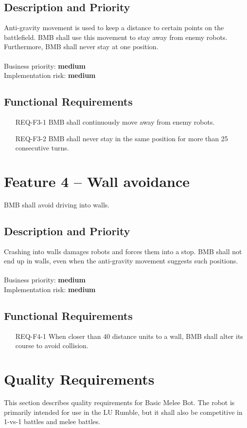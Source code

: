 \documentclass{scrreprt}
\begin{document}
\subsection{Description and Priority}
Anti-gravity movement is used to keep a distance to certain points on the battlefield. BMB shall use this movement to stay away from enemy robots. Furthermore, BMB shall never stay at one position.\\\\Business priority: \textbf{medium}\\
Implementation risk: \textbf{medium}

\subsection{Functional Requirements}
\begin{itemize}
\item[REQ-F3-1] BMB shall continuously move away from enemy robots.
\item[REQ-F3-2] BMB shall never stay in the same position for more than 25 consecutive turns.
\end{itemize}

\section{Feature 4 -- Wall avoidance}
BMB shall avoid driving into walls.

\subsection{Description and Priority}
Crashing into walls damages robots and forces them into a stop. BMB shall not end up in walls, even when the anti-gravity movement suggests such positions.\\\\Business priority: \textbf{medium}\\
Implementation risk: \textbf{medium}

\subsection{Functional Requirements}
\begin{itemize}
\item[REQ-F4-1] When closer than 40 distance units to a wall, BMB shall alter its course to avoid collision.
\end{itemize}

\section{Quality Requirements}
This section describes quality requirements for Basic Melee Bot. The robot is primarily intended for use in the LU Rumble, but it shall also be competitive in 1-vs-1 battles and melee battles.
\end{document}
